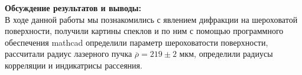\documentclass[a4paper, 12pt]{article}%
\begin{document}
	

	
	\textbf{Обсуждение результатов и выводы: }\\
	
	В ходе данной работы мы познакомились с явлением дифракции на шероховатой поверхности, получили картины спеклов и по ним с помощью программного обеспечения mathcad определили параметр шероховатости поверхности, рассчитали радиус лазерного пучка $\overline{\rho} = 219 \pm 2$ мкм, определили радиусы корреляции и индикатрисы рассеяния.
	
	
	
	
	
	
	
	
	
	
	
	
	
	
	
	
	
	
	
	
	
	
	
	
	
	
	
	
\end{document}
